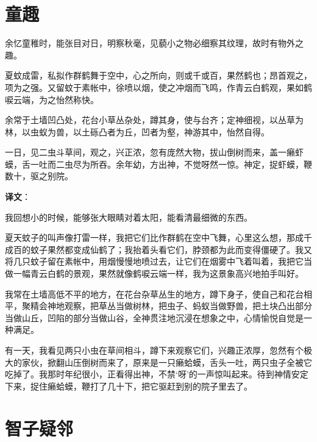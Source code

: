 \documentclass[12pt,UTF-8,openany]{ctexbook}
\begin{document}
\chapter{童趣}

\begin{normalsize}
    
    余忆童稚时，能张目对日，明察秋毫，见藐小之物必细察其纹理，故时有物外之趣。
    
    夏蚊成雷，私拟作群鹤舞于空中，心之所向，则或千或百，果然鹤也；昂首观之，项为之强。又留蚊于素帐中，徐喷以烟，使之冲烟而飞鸣，作青云白鹤观，果如鹤唳云端，为之怡然称快。
    
    余常于土墙凹凸处，花台小草丛杂处，蹲其身，使与台齐；定神细视，以丛草为林，以虫蚁为兽，以土砾凸者为丘，凹者为壑，神游其中，怡然自得。
    
    一日，见二虫斗草间，观之，兴正浓，忽有庞然大物，拔山倒树而来，盖一癞虾蟆，舌一吐而二虫尽为所吞。余年幼，方出神，不觉呀然一惊。神定，捉虾蟆，鞭数十，驱之别院。
\end{normalsize}


\newpage

\textbf{译文}：

\vspace{1em}

\begin{normalsize}
    
    我回想小的时候，能够张大眼睛对着太阳，能看清最细微的东西。
    
    夏天蚊子的叫声像打雷一样，我把它们比作群鹤在空中飞舞，心里这么想，那成千成百的蚊子果然都变成仙鹤了；我抬着头看它们，脖颈都为此而变得僵硬了。我又将几只蚊子留在素帐中，用烟慢慢地喷过去，让它们在烟雾中飞着叫着，我把它当做一幅青云白鹤的景观，果然就像鹤唳云端一样，我为这景象高兴地拍手叫好。
    
    我常在土墙高低不平的地方，在花台杂草丛生的地方，蹲下身子，使自己和花台相平，聚精会神地观察，把草丛当做树林，把虫子、蚂蚁当做野兽，把土块凸出部分当做山丘，凹陷的部分当做山谷，全神贯注地沉浸在想象之中，心情愉悦自觉是一种满足。
    
    有一天，我看见两只小虫在草间相斗，蹲下来观察它们，兴趣正浓厚，忽然有个极大的家伙，掀翻山压倒树而来了，原来是一只癞蛤蟆，舌头一吐，两只虫子全被它吃掉了。我那时年纪很小，正看得出神，不禁‘呀’的一声惊叫起来。待到神情安定下来，捉住癞蛤蟆，鞭打了几十下，把它驱赶到别的院子里去了。
    
\end{normalsize}



\chapter{智子疑邻}
\end{document}
